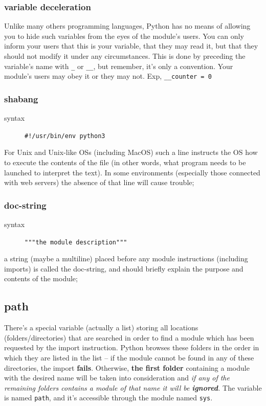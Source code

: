 \documentclass[11pt]{article}
\begin{document}
\subsubsection{variable deceleration}
\label{sec:org08f6e9c}
Unlike many others programming languages, Python has no means of
allowing you to hide such variables from the eyes of the module’s
users. You can only inform your users that this is your variable, that
they may read it, but that they should not modify it under any
circumstances. This is done by preceding the variable’s name with \texttt{\_}
or \texttt{\_\_}, but remember, it’s only a convention. Your module’s users may
obey it or they may not. Exp, \texttt{\_\_counter = 0}

\subsubsection{shabang}
\label{sec:org2d84c04}
\begin{description}
\item[{syntax}] \texttt{\#!/usr/bin/env python3}
\end{description}
For Unix and Unix-like OSs (including MacOS) such a line instructs the
OS how to execute the contents of the file (in other words, what
program needs to be launched to interpret the text). In some
environments (especially those connected with web servers) the absence
of that line will cause trouble;

\subsubsection{doc-string}
\label{sec:org7d18760}
\begin{description}
\item[{syntax}] \texttt{"""the module description"""}
\end{description}
a string (maybe a multiline) placed before any module instructions
(including imports) is called the doc-string, and should briefly
explain the purpose and contents of the module;

\subsection{path}
\label{sec:org7470f14}
There’s a special variable (actually a list) storing all locations
(folders/directories) that are searched in order to find a module
which has been requested by the import instruction. Python browses
these folders in the order in which they are listed in the list – if
the module cannot be found in any of these directories, the import
\textbf{fails}. Otherwise, \textbf{the first folder} containing a module with the
desired name will be taken into consideration and \emph{if any of the}
\emph{remaining folders contains a module of that name it will be}
\emph{\textbf{ignored}.} The variable is named \texttt{path}, and it’s accessible through
the module named \texttt{sys}.
\end{document}
